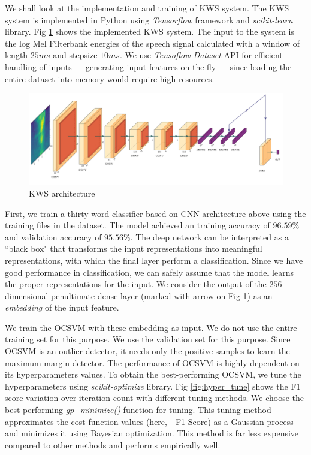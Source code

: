 \documentclass[a4paper]{article}
\begin{document}
We shall look at the implementation and training of KWS system. The KWS system is implemented in Python using \textit{Tensorflow} framework and \textit{scikit-learn} library. Fig \ref{fig:feature_embedder} shows the implemented KWS system. The input to the system is the log Mel Filterbank energies of the speech signal calculated with a window of length $25ms$ and stepsize $10ms$. We use \textit{Tensoflow Dataset} API for efficient handling of inputs --- generating input features on-the-fly --- since loading the entire dataset into memory would require high resources.

\begin{figure}[h]
	\centering
	\includegraphics[width=1\linewidth]{../results/kws3.jpg}
	\caption{KWS architecture}
	\label{fig:feature_embedder}
\end{figure}

First, we train a thirty-word classifier based on CNN architecture above using the training files in the dataset. The model achieved an training accuracy of $96.59\%$ and validation accuracy of $95.56\%$. The deep network can be interpreted as a ``black box" that transforms the input representations into meaningful representations, with which the final layer perform a classification. Since we have good performance in classification, we can safely assume that the model learns the proper representations for the input. We consider the output of the $256$ dimensional penultimate dense layer (marked with arrow on Fig \ref{fig:feature_embedder}) as an \textit{embedding} of the input feature. 

We train the OCSVM with these embedding as input. We do not use the entire training set for this purpose. We use the validation set for this purpose. Since OCSVM is an outlier detector, it needs only the positive samples to learn the maximum margin detector. The performance of OCSVM is highly dependent on its hyperparameters values. To obtain the best-performing OCSVM, we tune the hyperparameters using \textit{scikit-optimize} library. Fig \ref{fig:hyper_tune} shows the F1 score variation over iteration count with different tuning methods. We choose the best performing \textit{gp\_minimize()} function for tuning. This tuning method approximates the cost function values
(here, - F1 Score) as a Gaussian process and minimizes it using Bayesian optimization. This method is far less expensive compared to other methods and performs empirically well.
\end{document}
